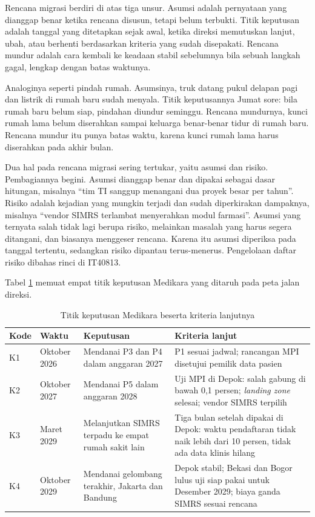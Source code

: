 Rencana migrasi berdiri di atas tiga unsur. Asumsi adalah pernyataan yang
dianggap benar ketika rencana disusun, tetapi belum terbukti. Titik keputusan
adalah tanggal yang ditetapkan sejak awal, ketika direksi memutuskan lanjut,
ubah, atau berhenti berdasarkan kriteria yang sudah disepakati. Rencana mundur
adalah cara kembali ke keadaan stabil sebelumnya bila sebuah langkah gagal,
lengkap dengan batas waktunya.

Analoginya seperti pindah rumah. Asumsinya, truk datang pukul delapan pagi dan
listrik di rumah baru sudah menyala. Titik keputusannya Jumat sore: bila rumah
baru belum siap, pindahan diundur seminggu. Rencana mundurnya, kunci rumah lama
belum diserahkan sampai keluarga benar-benar tidur di rumah baru. Rencana
mundur itu punya batas waktu, karena kunci rumah lama harus diserahkan pada
akhir bulan.

Dua hal pada rencana migrasi sering tertukar, yaitu asumsi dan risiko.
Pembagiannya begini. Asumsi dianggap benar dan dipakai sebagai dasar hitungan,
misalnya ``tim TI sanggup menangani dua proyek besar per tahun''. Risiko adalah
kejadian yang mungkin terjadi dan sudah diperkirakan dampaknya, misalnya
``vendor SIMRS terlambat menyerahkan modul farmasi''. Asumsi yang ternyata
salah tidak lagi berupa risiko, melainkan masalah yang harus segera ditangani,
dan biasanya menggeser rencana. Karena itu asumsi diperiksa pada tanggal
tertentu, sedangkan risiko dipantau terus-menerus. Pengelolaan daftar risiko
dibahas rinci di IT40813.

Tabel \ref{tab:ch12-keputusan} memuat empat titik keputusan Medikara yang
ditaruh pada peta jalan direksi.

\begin{table}[!htb]
  \centering
  \caption{Titik keputusan Medikara beserta kriteria lanjutnya}
  \label{tab:ch12-keputusan}
  \begin{tabularx}{\textwidth}{l>{\raggedright\arraybackslash}p{1.65cm}
                               >{\raggedright\arraybackslash}X
                               >{\raggedright\arraybackslash}X}
    \hline
    \textbf{Kode} & \textbf{Waktu} & \textbf{Keputusan} & \textbf{Kriteria lanjut} \\
    \hline
    K1 & Oktober 2026 & Mendanai P3 dan P4 dalam anggaran 2027 & P1 sesuai
      jadwal; rancangan MPI disetujui pemilik data pasien \\
    \hline
    K2 & Oktober 2027 & Mendanai P5 dalam anggaran 2028 & Uji MPI di Depok:
      salah gabung di bawah 0,1 persen; \textit{landing zone} selesai; vendor
      SIMRS terpilih \\
    \hline
    K3 & Maret 2029 & Melanjutkan SIMRS terpadu ke empat rumah sakit lain &
      Tiga bulan setelah dipakai di Depok: waktu pendaftaran tidak naik lebih
      dari 10 persen, tidak ada data klinis hilang \\
    \hline
    K4 & Oktober 2029 & Mendanai gelombang terakhir, Jakarta dan Bandung &
      Depok stabil; Bekasi dan Bogor lulus uji siap pakai untuk Desember 2029;
      biaya ganda SIMRS sesuai rencana \\
    \hline
  \end{tabularx}
\end{table}

